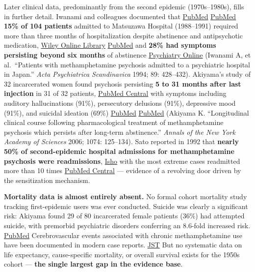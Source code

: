 Later clinical data, predominantly from the second epidemic (1970s--1980s), fills in further detail. Iwanami and colleagues documented that \href{https://pubmed.ncbi.nlm.nih.gov/8085475/?dopt=Abstract}{PubMed} \href{https://pubmed.ncbi.nlm.nih.gov/8085475/}{PubMed} \textbf{15\% of 104 patients} admitted to Matsuzawa Hospital (1988--1991) required more than three months of hospitalization despite abstinence and antipsychotic medication, \href{https://onlinelibrary.wiley.com/doi/abs/10.1111/j.1600-0447.1994.tb01541.x}{Wiley Online Library} \href{https://pubmed.ncbi.nlm.nih.gov/8085475/}{PubMed} and \textbf{28\% had symptoms persisting beyond six months} of abstinence \href{https://psychiatryonline.org/doi/10.1176/appi.ajp.2009.08111695}{Psychiatry Online} (Iwanami A, et al.~``Patients with methamphetamine psychosis admitted to a psychiatric hospital in Japan.'' \emph{Acta Psychiatrica Scandinavica} 1994; 89: 428--432). Akiyama's study of 32 incarcerated women found psychosis persisting \textbf{5 to 31 months after last injection} in 31 of 32 patients, \href{https://pmc.ncbi.nlm.nih.gov/articles/PMC7004251/}{PubMed Central} with symptoms including auditory hallucinations (91\%), persecutory delusions (91\%), depressive mood (91\%), and suicidal ideation (69\%) \href{https://pubmed.ncbi.nlm.nih.gov/21477052/}{PubMed} \href{https://pubmed.ncbi.nlm.nih.gov/17105910/}{PubMed} (Akiyama K. ``Longitudinal clinical course following pharmacological treatment of methamphetamine psychosis which persists after long-term abstinence.'' \emph{Annals of the New York Academy of Sciences} 2006; 1074: 125--134). Sato reported in 1992 that \textbf{nearly 50\% of second-epidemic hospital admissions for methamphetamine psychosis were readmissions}, \href{https://webview.isho.jp/journal/detail/abs/10.11477/mf.1405904147}{Isho} with the most extreme cases readmitted more than 10 times \href{https://pmc.ncbi.nlm.nih.gov/articles/PMC5027896/}{PubMed Central} --- evidence of a revolving door driven by the sensitization mechanism.

\textbf{Mortality data is almost entirely absent.} No formal cohort mortality study tracking first-epidemic users was ever conducted. Suicide was clearly a significant risk: Akiyama found 29 of 80 incarcerated female patients (36\%) had attempted suicide, with premorbid psychiatric disorders conferring an 8.6-fold increased risk. \href{https://pubmed.ncbi.nlm.nih.gov/21477052/}{PubMed} Cerebrovascular events associated with chronic methamphetamine use have been documented in modern case reports. \href{https://www.jstage.jst.go.jp/article/jstroke/advpub/0/advpub_10992/_article/-char/ja/}{JST} But no systematic data on life expectancy, cause-specific mortality, or overall survival exists for the 1950s cohort --- \textbf{the single largest gap in the evidence base}.

